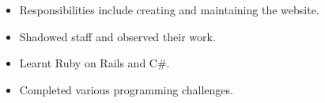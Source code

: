 \documentclass{jcgcv}
\begin{document}
\begin{column}
\begin{itemize}
  \item Responsibilities include creating and maintaining the website.
\end{itemize}

\begin{itemize}
  \item Shadowed staff and observed their work.
  \item Learnt Ruby on Rails and C\#.
  \item Completed various programming challenges.
\end{itemize}



\end{column}%
\end{document}
